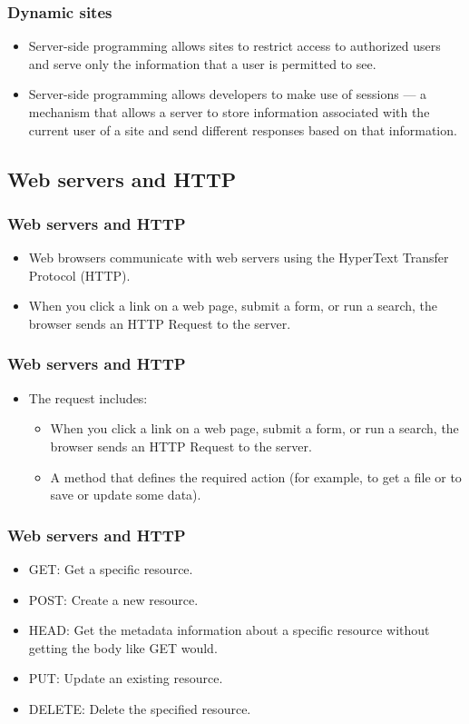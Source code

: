 \documentclass{beamer}
\begin{document}
\begin{frame}
\frametitle{Dynamic sites}
\begin{itemize}
    \item Server-side programming allows sites to restrict access to authorized users and serve only the information that a user is permitted to see.
    \item Server-side programming allows developers to make use of sessions — a mechanism that allows a server to store information associated with the current user of a site and send different responses based on that information.
\end{itemize}
\end{frame}
\subsection{Web servers and HTTP }
\begin{frame}
\frametitle{Web servers and HTTP }
\begin{itemize}
    \item Web browsers communicate with web servers using the HyperText Transfer Protocol (HTTP). 
    \item When you click a link on a web page, submit a form, or run a search, the browser sends an HTTP Request to the server.
  \end{itemize}
\end{frame}
\begin{frame}
\frametitle{Web servers and HTTP }
\begin{itemize}
    \item The request includes:
    \begin{itemize}
    \item When you click a link on a web page, submit a form, or run a search, the browser sends an HTTP Request to the server.
    \item A method that defines the required action (for example, to get a file or to save or update some data). 
  \end{itemize}
  \end{itemize}
\end{frame}
\begin{frame}
\frametitle{Web servers and HTTP }
\begin{itemize}
 \item GET: Get a specific resource.
\item POST: Create a new resource.
\item HEAD: Get the metadata information about a specific resource without getting the body like GET would. 
\item PUT: Update an existing resource.
\item DELETE: Delete the specified resource.
   \end{itemize}
\end{frame}
\end{document}
